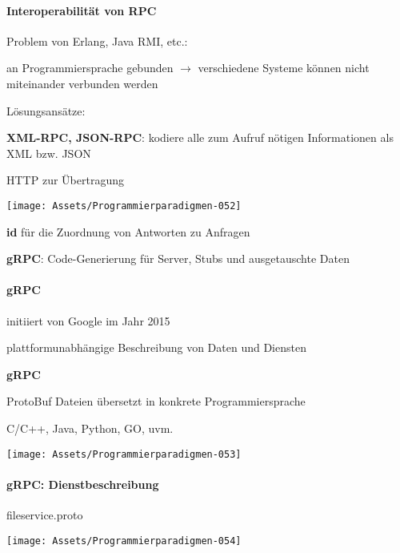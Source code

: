 \documentclass[10pt]{article}
\begin{document}
\paragraph{Interoperabilität von RPC}
Problem von Erlang, Java RMI, etc.: 
\begin{itemize*}
  \item an Programmiersprache gebunden $\rightarrow$ verschiedene Systeme können nicht miteinander verbunden werden
\end{itemize*}
Lösungsansätze: 
\begin{itemize*}
  \item \textbf{XML-RPC, JSON-RPC}: kodiere alle zum Aufruf nötigen Informationen als XML bzw. JSON
  \begin{itemize*}
    \item HTTP zur Übertragung
    \item 	\texttt{[image: Assets/Programmierparadigmen-052]}
    \item \textbf{id} für die Zuordnung von Antworten zu Anfragen
  \end{itemize*}
  \item \textbf{gRPC}: Code-Generierung für Server, Stubs und ausgetauschte Daten
\end{itemize*}

\paragraph{gRPC}
\begin{itemize*}
  \item initiiert von Google im Jahr 2015
  \item plattformunabhängige Beschreibung von Daten und Diensten
\end{itemize*}
\color{orange} \textbf{gRPC} \color{black}
\begin{itemize*}
  \item ProtoBuf Dateien übersetzt in konkrete Programmiersprache
  \item C/C++, Java, Python, GO, uvm.
\end{itemize*}
\begin{center}
  \centering
  \texttt{[image: Assets/Programmierparadigmen-053]}
\end{center}

\paragraph{gRPC: Dienstbeschreibung}
fileservice.proto
\begin{center}
  \centering
  \texttt{[image: Assets/Programmierparadigmen-054]}
\end{center}
\end{document}
